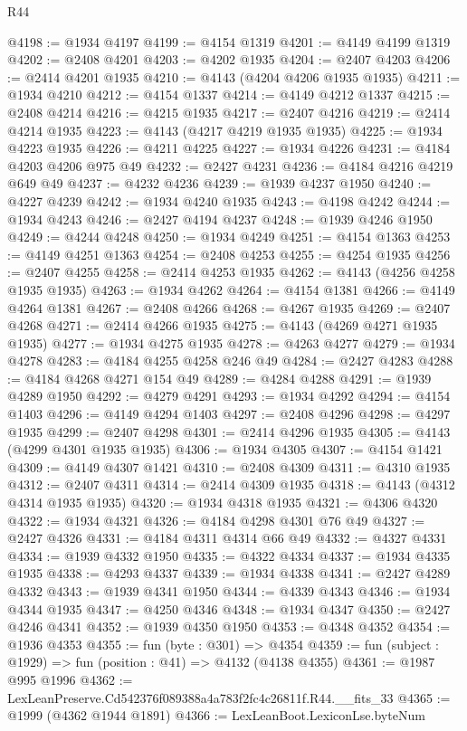 \begin{lexlean}{R44}
\begin{coremodule}
@4198 := @1934 @4197
@4199 := @4154 @1319
@4201 := @4149 @4199 @1319
@4202 := @2408 @4201
@4203 := @4202 @1935
@4204 := @2407 @4203
@4206 := @2414 @4201 @1935
@4210 := @4143 (@4204 @4206 @1935 @1935)
@4211 := @1934 @4210
@4212 := @4154 @1337
@4214 := @4149 @4212 @1337
@4215 := @2408 @4214
@4216 := @4215 @1935
@4217 := @2407 @4216
@4219 := @2414 @4214 @1935
@4223 := @4143 (@4217 @4219 @1935 @1935)
@4225 := @1934 @4223 @1935
@4226 := @4211 @4225
@4227 := @1934 @4226
@4231 := @4184 @4203 @4206 @975 @49
@4232 := @2427 @4231
@4236 := @4184 @4216 @4219 @649 @49
@4237 := @4232 @4236
@4239 := @1939 @4237 @1950
@4240 := @4227 @4239
@4242 := @1934 @4240 @1935
@4243 := @4198 @4242
@4244 := @1934 @4243
@4246 := @2427 @4194 @4237
@4248 := @1939 @4246 @1950
@4249 := @4244 @4248
@4250 := @1934 @4249
@4251 := @4154 @1363
@4253 := @4149 @4251 @1363
@4254 := @2408 @4253
@4255 := @4254 @1935
@4256 := @2407 @4255
@4258 := @2414 @4253 @1935
@4262 := @4143 (@4256 @4258 @1935 @1935)
@4263 := @1934 @4262
@4264 := @4154 @1381
@4266 := @4149 @4264 @1381
@4267 := @2408 @4266
@4268 := @4267 @1935
@4269 := @2407 @4268
@4271 := @2414 @4266 @1935
@4275 := @4143 (@4269 @4271 @1935 @1935)
@4277 := @1934 @4275 @1935
@4278 := @4263 @4277
@4279 := @1934 @4278
@4283 := @4184 @4255 @4258 @246 @49
@4284 := @2427 @4283
@4288 := @4184 @4268 @4271 @154 @49
@4289 := @4284 @4288
@4291 := @1939 @4289 @1950
@4292 := @4279 @4291
@4293 := @1934 @4292
@4294 := @4154 @1403
@4296 := @4149 @4294 @1403
@4297 := @2408 @4296
@4298 := @4297 @1935
@4299 := @2407 @4298
@4301 := @2414 @4296 @1935
@4305 := @4143 (@4299 @4301 @1935 @1935)
@4306 := @1934 @4305
@4307 := @4154 @1421
@4309 := @4149 @4307 @1421
@4310 := @2408 @4309
@4311 := @4310 @1935
@4312 := @2407 @4311
@4314 := @2414 @4309 @1935
@4318 := @4143 (@4312 @4314 @1935 @1935)
@4320 := @1934 @4318 @1935
@4321 := @4306 @4320
@4322 := @1934 @4321
@4326 := @4184 @4298 @4301 @76 @49
@4327 := @2427 @4326
@4331 := @4184 @4311 @4314 @66 @49
@4332 := @4327 @4331
@4334 := @1939 @4332 @1950
@4335 := @4322 @4334
@4337 := @1934 @4335 @1935
@4338 := @4293 @4337
@4339 := @1934 @4338
@4341 := @2427 @4289 @4332
@4343 := @1939 @4341 @1950
@4344 := @4339 @4343
@4346 := @1934 @4344 @1935
@4347 := @4250 @4346
@4348 := @1934 @4347
@4350 := @2427 @4246 @4341
@4352 := @1939 @4350 @1950
@4353 := @4348 @4352
@4354 := @1936 @4353
@4355 := fun (byte : @301) => @4354
@4359 := fun (subject : @1929) => fun (position : @41) => @4132 (@4138 @4355)
@4361 := @1987 @995 @1996
@4362 := LexLeanPreserve.Cd542376f089388a4a783f2fc4c26811f.R44.__fits_33
@4365 := @1999 (@4362 @1944 @1891)
@4366 := LexLeanBoot.LexiconLse.byteNum

\end{coremodule}
\end{lexlean}
